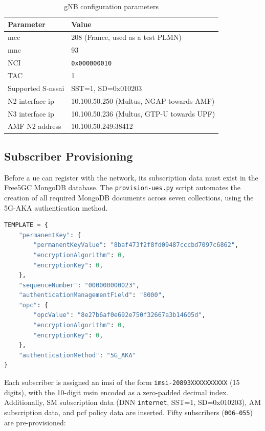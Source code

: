\begin{table}[H]
  \centering
  \caption{gNB configuration parameters}
  \label{tab:gnb_config}
  \begin{tabularx}{\linewidth}{lX}
    \toprule
    \textbf{Parameter}  & \textbf{Value} \\
    \midrule
    \gls{mcc}           & 208 (France, used as a test PLMN) \\
    \gls{mnc}           & 93 \\
    NCI                 & \texttt{0x000000010} \\
    TAC                 & 1 \\
    Supported S-\gls{nssai} & SST=1, SD=0x010203 \\
    N2 interface \gls{ip} & 10.100.50.250 (Multus, NGAP towards AMF) \\
    N3 interface \gls{ip} & 10.100.50.236 (Multus, GTP-U towards UPF) \\
    AMF N2 address      & 10.100.50.249:38412 \\
    \bottomrule
  \end{tabularx}
\end{table}

\subsection{Subscriber Provisioning}

Before a \gls{ue} can register with the network, its subscription data must exist in the Free5GC MongoDB database. The \texttt{provision-ues.py} script automates the creation of all required MongoDB documents across seven collections, using the 5G-AKA authentication method.

\begin{lstlisting}[language=python, caption={Core subscriber provisioning template in provision-ues.py}, label={lst:provision_template}]
TEMPLATE = {
    "permanentKey": {
        "permanentKeyValue": "8baf473f2f8fd09487cccbd7097c6862",
        "encryptionAlgorithm": 0,
        "encryptionKey": 0,
    },
    "sequenceNumber": "000000000023",
    "authenticationManagementField": "8000",
    "opc": {
        "opcValue": "8e27b6af0e692e750f32667a3b14605d",
        "encryptionAlgorithm": 0,
        "encryptionKey": 0,
    },
    "authenticationMethod": "5G_AKA"
}
\end{lstlisting}

Each subscriber is assigned an \gls{imsi} of the form \texttt{imsi-20893XXXXXXXXXX} (15 digits), with the 10-digit \gls{msin} encoded as a zero-padded decimal index. Additionally, SM subscription data (DNN \texttt{internet}, SST=1, SD=0x010203), AM subscription data, and \gls{pcf} policy data are inserted. Fifty subscribers (\texttt{006}–\texttt{055}) are pre-provisioned:

